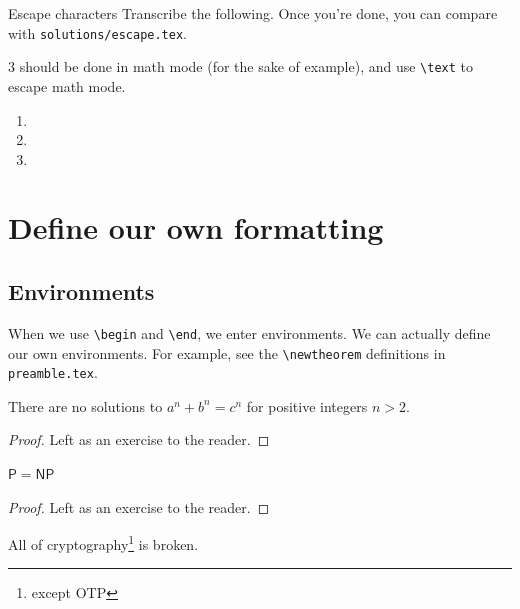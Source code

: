 \documentclass{article}
\begin{document}
\begin{exercise}{Escape characters}{}
    Transcribe the following. Once you're done, you can compare with \texttt{solutions/escape.tex}.

    

    3 should be done in math mode (for the sake of example), and use \texttt{\textbackslash text} to escape math mode.
    
\end{exercise}

\begin{solution}{}{}
    \begin{enumerate}
        \item 
        \item 
        \item
    \end{enumerate}
\end{solution}

\section{Define our own formatting}

\subsection{Environments}

When we use \texttt{\textbackslash begin} and \texttt{\textbackslash end}, we enter environments. We can actually define our own environments. For example, see the \texttt{\textbackslash newtheorem} definitions in \texttt{preamble.tex}.

\begin{theorem}
    There are no solutions to $a^n+b^n=c^n$ for positive integers $n > 2$.
\end{theorem}

\begin{proof}
    Left as an exercise to the reader.
\end{proof}

\begin{theorem}
    $\mathsf{P}=\mathsf{NP}$
\end{theorem}

\begin{proof}
    Left as an exercise to the reader.
\end{proof}

\begin{corollary}
    All of cryptography\footnote{except OTP} is broken.
\end{corollary}
\end{document}
